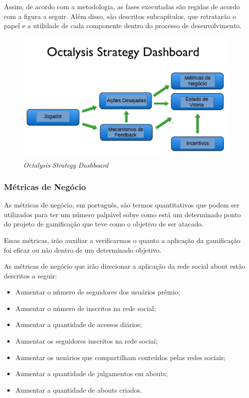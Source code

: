Assim, de acordo com a metodologia, as fases executadas são regidas de acordo com a
figura a seguir.  Além disso, são descritos subcapítulos, que retratarão o papel e a 
utilidade de cada componente dentro do processo de desenvolvimento.


 \begin{figure}[h]
     \centering

     \includegraphics[width=450px, scale=1]{figuras/dashboard}
     \caption{\textit{Octalysis} \textit{Strategy} \textit{Dashboard}}

     \label{fig:dashboard}
 \end{figure}

\subsubsection{Métricas de Negócio}
\label{sub:business_metrics}
As métricas de negócio, em português, são termos quantitativos que podem ser utilizados
para ter um número palpável sobre como está um determinado ponto do projeto de gamificação
que teve como o objetivo de ser atacado.

Essas métricas, irão auxiliar a verificarmos o quanto a aplicação da gamificação foi 
eficaz ou não dentro de um determinado objetivo.

As métricas de negócio que irão direcionar a aplicação da rede social about estão
descritos a seguir:

\begin{itemize}
    \item Aumentar o número de seguidores dos usuários prêmio;
    \item Aumentar o número de inscritos na rede social;
    \item Aumentar a quantidade de acessos diários;
    \item Aumentar os seguidores inscritos na rede sociai;
    \item Aumentar os usuários que compartilham conteúdos pelas redes sociais;
    \item Aumentar a quantidade de julgamentos em abouts;
    \item Aumentar a quantidade de abouts criados.
\end{itemize}

